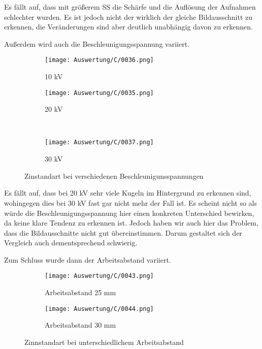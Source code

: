 Es fällt auf, dass mit größerem SS die Schärfe und die Auflösung der Aufnahmen schlechter wurden. Es ist jedoch nicht der wirklich der gleiche Bildausschnitt zu erkennen, die Veränderungen sind aber deutlich unabhängig davon zu erkennen.

\newpage
Außerdem wird auch die Beschleunigungsspannung variiert.
\begin{figure}[h]
    \centering
    \begin{subfigure}[b]{0.45\textwidth}
        \centering
        \texttt{[image: Auswertung/C/0036.png]}
        \caption{10 kV}
    \end{subfigure}
    \hfill
    \begin{subfigure}[b]{0.45\textwidth}
        \centering
        \texttt{[image: Auswertung/C/0035.png]}
        \caption{20 kV}
    \end{subfigure}
    \\
    \begin{subfigure}[b]{0.45\textwidth}
        \centering
        \texttt{[image: Auswertung/C/0037.png]}
        \caption{30 kV}
    \end{subfigure}
    \caption{Zinstandart bei verschiedenen Beschleunigunsspannungen}
\end{figure}

Es fällt auf, dass bei 20 kV sehr viele Kugeln im Hintergrund zu erkennen sind, wohingegen dies bei 30 kV fast gar nicht mehr der Fall ist. Es scheint nicht so als würde die Beschleunigungsspannung hier einen konkreten Unterschied bewirken, da keine klare Tendenz zu erkennen ist. Jedoch haben wir auch hier das Problem, dass die Bildausschnitte nicht gut übereinstimmen. Darum gestaltet sich der Vergleich auch dementsprechend schwierig.

\newpage
Zum Schluss wurde dann der Arbeitsabstand variiert.
\begin{figure}[h]
    \centering
    
    \begin{subfigure}[b]{0.45\textwidth}
        \centering
        \texttt{[image: Auswertung/C/0043.png]}
        \caption{Arbeitsabstand 25 mm}
    \end{subfigure}
    \hfill
    \begin{subfigure}[b]{0.45\textwidth}
        \centering
        \texttt{[image: Auswertung/C/0044.png]}
        \caption{Arbeitsabstand 30 mm}
    \end{subfigure}
    
    \caption{Zinnstandart bei unterschiedlichem Arbeitsabstand}
    \label{fig:43WD}
\end{figure}

